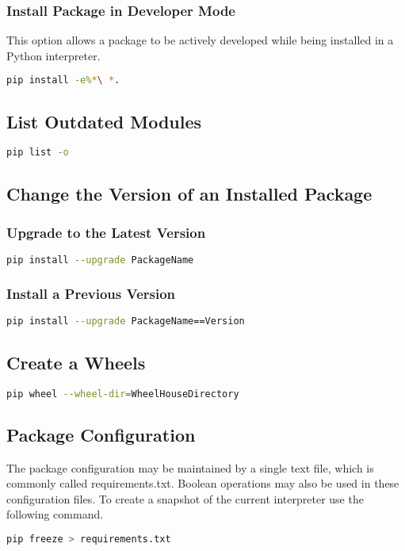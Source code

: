 \subsubsection{Install Package in Developer Mode}
This option allows a package to be actively developed while being installed in
a Python interpreter.
\begin{lstlisting}[language=bash, numbers=none]
  pip install -e%*\ *.
\end{lstlisting}

\subsection{List Outdated Modules}
\begin{lstlisting}[language=bash, numbers=none]
  pip list -o
\end{lstlisting}

\subsection{Change the Version of an Installed Package}
%
\subsubsection{Upgrade to the Latest Version}
\begin{lstlisting}[language=bash, numbers=none]
  pip install --upgrade PackageName
\end{lstlisting}

\subsubsection{Install a Previous Version}
\begin{lstlisting}[language=bash, numbers=none]
  pip install --upgrade PackageName==Version
\end{lstlisting}

\subsection{Create a Wheels}
\begin{lstlisting}[language=bash, numbers=none]
  pip wheel --wheel-dir=WheelHouseDirectory
\end{lstlisting}

\subsection{Package Configuration}
The package configuration may be maintained by a single text file, which is
commonly called requirements.txt. Boolean operations may also be used in these
configuration files. To create a snapshot of the current interpreter use the
following command.
\begin{lstlisting}[language=bash, numbers=none]
  pip freeze > requirements.txt
\end{lstlisting}
